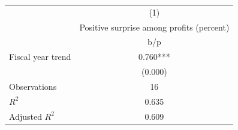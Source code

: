 {
\def\sym#1{\ifmmode^{#1}\else\(^{#1}\)\fi}
\begin{tabular}{l*{1}{c}}
\hline\hline
                    &\multicolumn{1}{c}{(1)}\\
                    &\multicolumn{1}{c}{Positive surprise among profits (percent)}\\
                    &         b/p   \\
\hline
Fiscal year trend   &       0.760***\\
                    &     (0.000)   \\
\hline
Observations        &          16   \\
\(R^{2}\)           &       0.635   \\
Adjusted \(R^{2}\)  &       0.609   \\
\hline\hline
\end{tabular}
}
